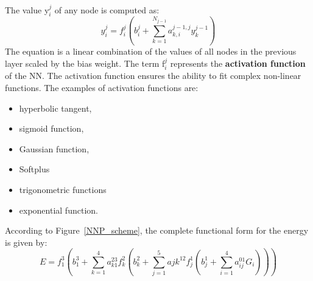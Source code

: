 \documentclass[12pt]{article}
\begin{document}
The value y$_i^j$ of any node is computed as:
\begin{equation}
    y_i^{j} = f_i^j(b_i^j + \sum_{k=1}^{N_{j-1}} a_{k,i}^{j-1,j} y_k^{j-1})
\end{equation}
The equation is a linear combination of the values of all nodes in the previous layer scaled by the bias weight. The term f$_i^j$ represents the \textbf{activation function} of the NN. The activation function ensures the ability to fit complex non-linear functions. The examples of activation functions are:
\begin{itemize}
    \item hyperbolic tangent,
    \item sigmoid function,
    \item Gaussian function,
    \item Softplus
    \item trigonometric functions
    \item exponential function.
\end{itemize}
According to Figure~\ref{NNP_scheme}, the complete functional form for the energy is given by:
\begin{equation}
    E = f_1^3(b_1^3 + \sum_{k=1}^4 a_{k1}^{23} f_k^2 (b_k^2 + \sum_{j=1}^5 a{jk}^{12} f_j^1 (b_j^1 + \sum_{i=1}^4 a_{ij}^{01} G_i)))
\end{equation}
\end{document}
